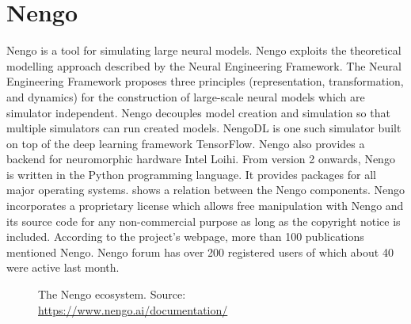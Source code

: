 \section{Nengo}

Nengo is a tool for simulating large neural models. Nengo exploits the theoretical modelling approach described by the Neural Engineering Framework. The Neural Engineering Framework proposes three principles (representation, transformation, and dynamics) for the construction of large-scale neural models which are simulator independent. Nengo decouples model creation and simulation so that multiple simulators can run created models. NengoDL is one such simulator built on top of the deep learning framework TensorFlow. Nengo also provides a backend for neuromorphic hardware Intel Loihi. From version 2 onwards, Nengo is written in the Python programming language. It provides packages for all major operating systems.  shows a relation between the Nengo components. Nengo incorporates a proprietary license which allows free manipulation with Nengo and its source code for any non-commercial purpose as long as the copyright notice is included. According to the project's webpage, more than 100 publications mentioned Nengo. Nengo forum has over 200 registered users of which about 40 were active last month.

\begin{figure}[ht]
    \centering
    
    \caption{The Nengo ecosystem. Source: \url{https://www.nengo.ai/documentation/}}
    \label{fig:nengo_ecosystem}
\end{figure}

